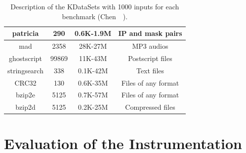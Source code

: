 \begin{table}[h]
{\begin{tabular}{|c|c|c|c|}
\rowcolor{gray!20}
patricia      & 290    & 0.6K-1.9M                  & IP and mask pairs              \\ \hline
\rowcolor{gray!20}
mad           & 2358   & 28K-27M                    & MP3 audios                     \\ \hline
\rowcolor{gray!20}
ghostscript   & 99869  & 11K-43M                    & Postscript files               \\ \hline
\rowcolor{gray!20}
stringsearch  & 338    &  0.1K-42M                 &  Text files                     \\ \hline
\rowcolor{gray!20}
CRC32         & 130    & 0.6K-35M                   & Files of any format            \\ \hline
\rowcolor{gray!20}
bzip2e        & 5125   & 0.7K-57M                   & Files of any format            \\ \hline
\rowcolor{gray!20}
bzip2d        & 5125   & 0.2K-25M                   & Compressed files               \\ \hline
\end{tabular}
}
\caption{Description of the KDataSets with 1000 inputs for each benchmark (Chen~\etal~\cite{chen10,chen12a}).}
\label{tab:kdatasets}
\end{table}

\section{Evaluation of the Instrumentation}

